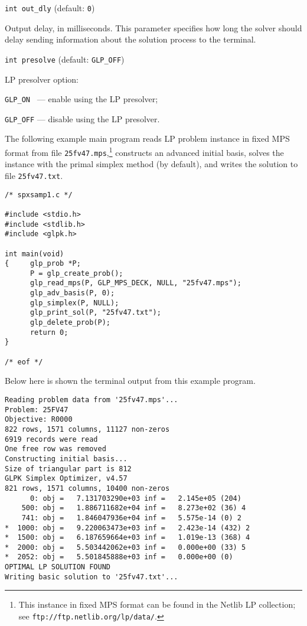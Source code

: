\bigskip

{\tt int out\_dly} (default: {\tt 0})

Output delay, in milliseconds. This parameter specifies how long the
solver should delay sending information about the solution process to
the terminal.

\bigskip

{\tt int presolve} (default: {\tt GLP\_OFF})

LP presolver option:

\verb|GLP_ON | --- enable using the LP presolver;

\verb|GLP_OFF| --- disable using the LP presolver.

\newpage


The following example main program reads LP problem instance in fixed
MPS format from file \verb|25fv47.mps|,\footnote{This instance in fixed
MPS format can be found in the Netlib LP collection; see
{\tt ftp://ftp.netlib.org/lp/data/}.} constructs an advanced initial
basis, solves the instance with the primal simplex method (by default),
and writes the solution to file \verb|25fv47.txt|.

\begin{footnotesize}
\begin{verbatim}
/* spxsamp1.c */

#include <stdio.h>
#include <stdlib.h>
#include <glpk.h>

int main(void)
{     glp_prob *P;
      P = glp_create_prob();
      glp_read_mps(P, GLP_MPS_DECK, NULL, "25fv47.mps");
      glp_adv_basis(P, 0);
      glp_simplex(P, NULL);
      glp_print_sol(P, "25fv47.txt");
      glp_delete_prob(P);
      return 0;
}

/* eof */
\end{verbatim}
\end{footnotesize}

Below here is shown the terminal output from this example program.

\begin{footnotesize}
\begin{verbatim}
Reading problem data from '25fv47.mps'...
Problem: 25FV47
Objective: R0000
822 rows, 1571 columns, 11127 non-zeros
6919 records were read
One free row was removed
Constructing initial basis...
Size of triangular part is 812
GLPK Simplex Optimizer, v4.57
821 rows, 1571 columns, 10400 non-zeros
      0: obj =   7.131703290e+03 inf =   2.145e+05 (204)
    500: obj =   1.886711682e+04 inf =   8.273e+02 (36) 4
    741: obj =   1.846047936e+04 inf =   5.575e-14 (0) 2
*  1000: obj =   9.220063473e+03 inf =   2.423e-14 (432) 2
*  1500: obj =   6.187659664e+03 inf =   1.019e-13 (368) 4
*  2000: obj =   5.503442062e+03 inf =   0.000e+00 (33) 5
*  2052: obj =   5.501845888e+03 inf =   0.000e+00 (0)
OPTIMAL LP SOLUTION FOUND
Writing basic solution to '25fv47.txt'...
\end{verbatim}
\end{footnotesize}

